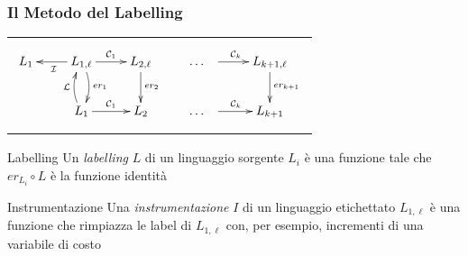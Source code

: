 \documentclass{beamer}
\newcommand{\cl}[1]{{\cal #1}}
\begin{document}
\begin{frame}
    \frametitle{Il Metodo del Labelling}
    \begin{center}
    \begin{tabular}{m{10cm}}
    $$
    \xymatrix{
      L_1 &
      \ar[l]^{\cl{I}}
      L_{1,\ell} 
      \ar@/^/[d]^{er_1} 
      \ar[r]^{\cl{C}_1}
    & L_{2,\ell} 
      \ar[d]^{er_2}  
    & \ldots \hspace{0.3cm}\ar[r]^{\cl{C}_k} 
    & L_{k+1,\ell} 
      \ar[d]^{er_{k+1}}  \\
    &
      L_1                                  
      \ar@/^/[u]^{\cl{L}} 
      \ar[r]^{\cl{C}_1}
    & L_2   
    & \ldots\hspace{0.3cm}
      \ar[r]^{\cl{C}_{k}}
    & L_{k+1}
    }
    $$
    \end{tabular}
    \end{center}
    \begin{block}{Labelling}
    Un \textit{labelling} $L$ di un linguaggio sorgente $L_i$ \`{e} una funzione tale che $er_{L_i}{\circ}L$ \`{e} la funzione identit\`{a}
    \end{block}
    \begin{block}{Instrumentazione}
    Una \textit{instrumentazione} $I$ di un linguaggio etichettato $L_{1,\ell}$ \`{e} una funzione che rimpiazza le label di $L_{1,\ell}$ con, per esempio, incrementi di una variabile di costo
    \end{block}
\end{frame}
\end{document}
